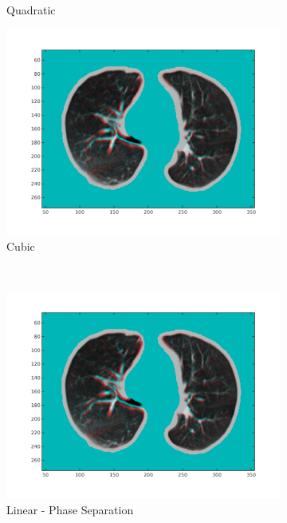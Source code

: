 \documentclass[11pt,a4paper,oneside]{report}
\begin{document}
\begin{figure}[H]
\begin{subfigure}[b]{0.33\textwidth}
    \caption{Quadratic}
  \end{subfigure}
  \begin{subfigure}[b]{0.33\textwidth}
    \includegraphics[width=\textwidth, trim=0 50 0 0,clip=true]{figures/task4/visAss_m3.png}
    \caption{Cubic}
  \end{subfigure}
  ~
  \hspace*{-2em}
  \begin{subfigure}[b]{0.33\textwidth}
    \includegraphics[width=\textwidth, trim=0 50 0 0,clip=true]{figures/task4/visAss_m4.png}
    \caption{Linear - Phase Separation}
  \end{subfigure}%
  \begin{subfigure}[b]{0.33\textwidth}

\end{subfigure}
\end{figure}
\end{document}

